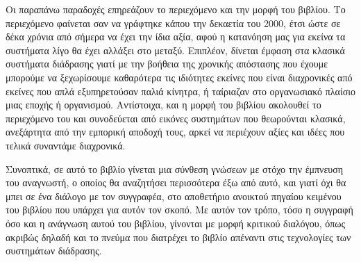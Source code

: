 \documentclass[
]{article}
\begin{document}
Οι παραπάνω παραδοχές επηρεάζουν το περιεχόμενο και την μορφή του
βιβλίου. Το περιεχόμενο φαίνεται σαν να γράφτηκε κάπου την δεκαετία του
2000, έτσι ώστε σε δέκα χρόνια από σήμερα να έχει την ίδια αξία, αφού η
κατανόηση μας για εκείνα τα συστήματα λίγο θα έχει αλλάξει στο μεταξύ.
Επιπλέον, δίνεται έμφαση στα κλασικά συστήματα διάδρασης γιατί με την
βοήθεια της χρονικής απόστασης που έχουμε μπορούμε να ξεχωρίσουμε
καθαρότερα τις ιδιότητες εκείνες που είναι διαχρονικές από εκείνες που
απλά εξυπηρετούσαν παλιά κίνητρα, ή ταίριαζαν στο οργανωσιακό πλαίσιο
μιας εποχής ή οργανισμού. Αντίστοιχα, και η μορφή του βιβλίου ακολουθεί
το περιεχόμενο του και συνοδεύεται από εικόνες συστημάτων που θεωρούνται
κλασικά, ανεξάρτητα από την εμπορική αποδοχή τους, αρκεί να περιέχουν
αξίες και ιδέες που τελικά συναντάμε διαχρονικά.

Συνοπτικά, σε αυτό το βιβλίο γίνεται μια σύνθεση γνώσεων με στόχο την
έμπνευση του αναγνωστή, ο οποίος θα αναζητήσει περισσότερα έξω από αυτό,
και γιατί όχι θα μπει σε ένα διάλογο με τον συγγραφέα, στο αποθετήριο
ανοικτού πηγαίου κειμένου του βιβλίου που υπάρχει για αυτόν τον σκοπό.
Με αυτόν τον τρόπο, τόσο η συγγραφή όσο και η ανάγνωση αυτού του
βιβλίου, γίνονται με μορφή κριτικού διαλόγου, όπως ακριβώς δηλαδή και το
πνεύμα που διατρέχει το βιβλίο απέναντι στις τεχνολογίες των συστημάτων
διάδρασης.
\end{document}
